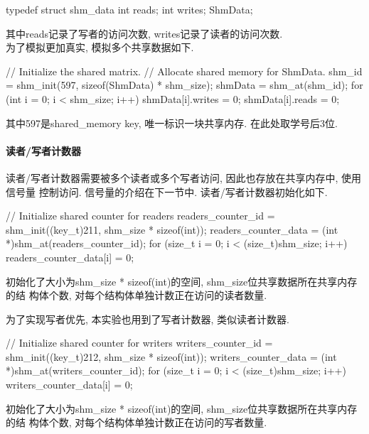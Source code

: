 \begin{code}
    typedef struct shm_data {
    int reads;
    int writes;
    } ShmData;
\end{code}

其中reads记录了写者的访问次数, writes记录了读者的访问次数.\\
为了模拟更加真实, 模拟多个共享数据如下.
\begin{code}
    // Initialize the shared matrix.
    // Allocate shared memory for ShmData.
    shm_id = shm_init(597, sizeof(ShmData) * shm_size);
    shmData = shm_at(shm_id);
    for (int i = 0; i < shm_size; i++) {
            shmData[i].writes = 0;
            shmData[i].reads = 0;
        }

\end{code}
其中597是shared\_memory key, 唯一标识一块共享内存. 在此处取学号后3位.

\paragraph{读者/写者计数器}
读者/写者计数器需要被多个读者或多个写者访问, 因此也存放在共享内存中, 使用信号量
控制访问. 信号量的介绍在下一节中. 读者/写者计数器初始化如下.
\begin{code}[caption={读者计数器}]
    // Initialize shared counter for readers
    readers_counter_id = shm_init((key_t)211, shm_size * sizeof(int));
    readers_counter_data = (int *)shm_at(readers_counter_id);
    for (size_t i = 0; i < (size_t)shm_size; i++) {
    readers_counter_data[i] = 0;
    }
\end{code}
初始化了大小为shm\_size * sizeof(int)的空间, shm\_size位共享数据所在共享内存的结
构体个数, 对每个结构体单独计数正在访问的读者数量.

为了实现写者优先, 本实验也用到了写者计数器, 类似读者计数器.
\begin{code}[caption={写者计数器}]
    // Initialize shared counter for writers
    writers_counter_id = shm_init((key_t)212, shm_size * sizeof(int));
    writers_counter_data = (int *)shm_at(writers_counter_id);
    for (size_t i = 0; i < (size_t)shm_size; i++) {
    writers_counter_data[i] = 0;
    }
\end{code}
初始化了大小为shm\_size * sizeof(int)的空间, shm\_size位共享数据所在共享内存的结
构体个数, 对每个结构体单独计数正在访问的写者数量.

